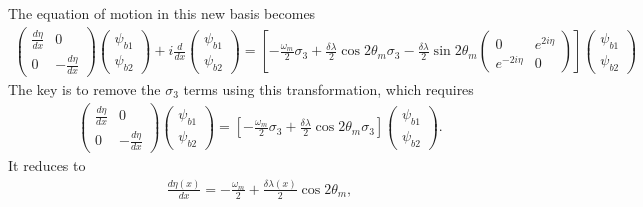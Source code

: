 \documentclass[letterpaper,12pt,english]{sphinxmanual}
\begin{document}
The equation of motion in this new basis becomes
\begin{equation*}
\begin{split}\begin{pmatrix}  \frac{d\eta}{dx}  & 0 \\ 0 & - \frac{d\eta}{dx}  \end{pmatrix} \begin{pmatrix} \psi_{b1} \\ \psi_{b2} \end{pmatrix} + i \frac{d}{dx} \begin{pmatrix} \psi_{b1} \\ \psi_{b2} \end{pmatrix} =
\left[ -\frac{\omega_m}{2} \sigma_3  + \frac{\delta \lambda}{2} \cos 2\theta_m  \sigma_3  - \frac{\delta \lambda}{2} \sin 2\theta_m \begin{pmatrix} 0 & e^{2i\eta} \\ e^{-2 i\eta } & 0 \end{pmatrix}   \right] \begin{pmatrix} \psi_{b1} \\ \psi_{b2} \end{pmatrix}\end{split}
\end{equation*}
The key is to remove the \(\sigma_3\) terms using this transformation, which requires
\begin{equation*}
\begin{split}\begin{pmatrix}  \frac{d\eta}{dx}  & 0 \\ 0 & - \frac{d\eta}{dx}  \end{pmatrix} \begin{pmatrix} \psi_{b1} \\ \psi_{b2} \end{pmatrix} = \left[ -\frac{\omega_m}{2} \sigma_3  + \frac{\delta \lambda}{2} \cos 2\theta_m  \sigma_3 \right] \begin{pmatrix} \psi_{b1} \\ \psi_{b2} \end{pmatrix}.\end{split}
\end{equation*}
It reduces to
\begin{equation*}
\begin{split}\frac{d\eta(x)}{dx} = - \frac{\omega_m}{2} + \frac{\delta \lambda(x)}{2} \cos 2\theta_m ,\end{split}
\end{equation*}
\end{document}
